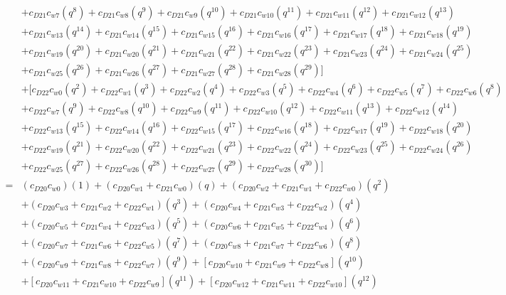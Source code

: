 \documentclass[12pt]{article}
\begin{document}
\begin{align}
    &+ c_{D21}c_{w7}(q^8) + c_{D21}c_{w8}(q^9) + c_{D21}c_{w9}(q^{10}) + c_{D21}c_{w10}(q^{11}) + c_{D21}c_{w11}(q^{12}) + c_{D21}c_{w12}(q^{13}) \nonumber\\
    &+ c_{D21}c_{w13}(q^{14}) + c_{D21}c_{w14}(q^{15}) + c_{D21}c_{w15}(q^{16}) + c_{D21}c_{w16}(q^{17}) + c_{D21}c_{w17}(q^{18}) + c_{D21}c_{w18}(q^{19}) \nonumber\\
    &+ c_{D21}c_{w19}(q^{20}) + c_{D21}c_{w20}(q^{21}) + c_{D21}c_{w21}(q^{22}) + c_{D21}c_{w22}(q^{23}) + c_{D21}c_{w23}(q^{24}) + c_{D21}c_{w24}(q^{25}) \nonumber\\
    &+ c_{D21}c_{w25}(q^{26}) + c_{D21}c_{w26}(q^{27}) + c_{D21}c_{w27}(q^{28}) + c_{D21}c_{w28}(q^{29}) ] \nonumber\\
    &+  [  c_{D22}c_{w0}(q^2) + c_{D22}c_{w1}(q^3) + c_{D22}c_{w2}(q^4) + c_{D22}c_{w3}(q^5) + c_{D22}c_{w4}(q^6) + c_{D22}c_{w5}(q^7) + c_{D22}c_{w6}(q^8) \nonumber\\
    &+ c_{D22}c_{w7}(q^9) + c_{D22}c_{w8}(q^{10}) + c_{D22}c_{w9}(q^{11}) + c_{D22}c_{w10}(q^{12}) + c_{D22}c_{w11}(q^{13}) + c_{D22}c_{w12}(q^{14}) \nonumber\\
    &+ c_{D22}c_{w13}(q^{15}) + c_{D22}c_{w14}(q^{16}) + c_{D22}c_{w15}(q^{17}) + c_{D22}c_{w16}(q^{18}) + c_{D22}c_{w17}(q^{19}) + c_{D22}c_{w18}(q^{20}) \nonumber\\
    &+ c_{D22}c_{w19}(q^{21}) + c_{D22}c_{w20}(q^{22}) + c_{D22}c_{w21}(q^{23}) + c_{D22}c_{w22}(q^{24}) + c_{D22}c_{w23}(q^{25}) + c_{D22}c_{w24}(q^{26}) \nonumber\\
    &+ c_{D22}c_{w25}(q^{27}) + c_{D22}c_{w26}(q^{28}) + c_{D22}c_{w27}(q^{29}) + c_{D22}c_{w28}(q^{30}) ] \\
    =& (c_{D20}c_{w0})(1) + (c_{D20}c_{w1} + c_{D21}c_{w0})(q) + (c_{D20}c_{w2} + c_{D21}c_{w1} + c_{D22}c_{w0})(q^2) \nonumber\\
    &+ (c_{D20}c_{w3} + c_{D21}c_{w2} + c_{D22}c_{w1})(q^3) + (c_{D20}c_{w4} + c_{D21}c_{w3} + c_{D22}c_{w2})(q^4) \nonumber\\
    &+ (c_{D20}c_{w5} + c_{D21}c_{w4} + c_{D22}c_{w3})(q^5) + (c_{D20}c_{w6} +  c_{D21}c_{w5} + c_{D22}c_{w4})(q^6) \nonumber\\
    &+ (c_{D20}c_{w7} + c_{D21}c_{w6} + c_{D22}c_{w5})(q^7) + (c_{D20}c_{w8} + c_{D21}c_{w7} + c_{D22}c_{w6})(q^8) \nonumber\\
    &+ (c_{D20}c_{w9} + c_{D21}c_{w8} + c_{D22}c_{w7})(q^9) + [c_{D20}c_{w10} + c_{D21}c_{w9} + c_{D22}c_{w8}](q^{10}) \nonumber\\
    &+ [c_{D20}c_{w11} + c_{D21}c_{w10} + c_{D22}c_{w9}](q^{11}) + [c_{D20}c_{w12} + c_{D21}c_{w11} + c_{D22}c_{w10}](q^{12}) \nonumber\\

\end{align}
\end{document}
